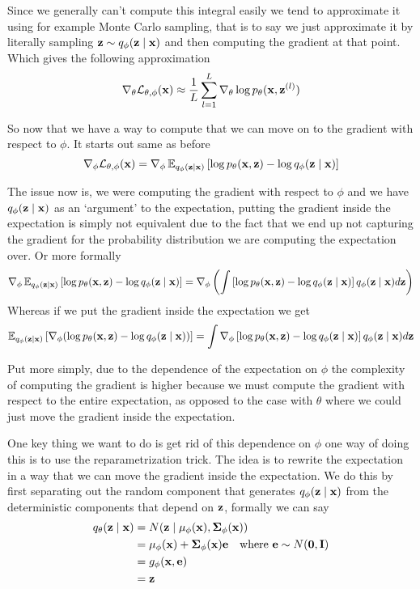\documentclass[12pt]{article}
\begin{document}
Since we generally can't compute this integral easily we tend to approximate it using for example Monte Carlo sampling, that is to say we just approximate it by literally sampling $\mathbf{z} \sim q_\phi(\mathbf{z}\mid \mathbf{x})$ and then computing the gradient at that point. Which gives the following approximation
\[
    \nabla_\theta \mathcal L_{\theta, \phi}(\mathbf{x}) \approx \frac{1}{L}\sum_{l=1}^L \nabla_\theta \log p_\theta(\mathbf{x}, \mathbf{z}^{(l)})    
\]

So now that we have a way to compute that we can move on to the gradient with respect to $\phi$. It starts out same as before 
\[
    \nabla_\phi \mathcal L_{\theta, \phi}(\mathbf{x}) = \nabla_\phi \operatorname{\mathbb{E}}_{q_\phi(\mathbf{z}\mid \mathbf{x})} \left[ \log p_\theta(\mathbf{x}, \mathbf{z}) - \log q_\phi(\mathbf{z} \mid \mathbf{x})\right]    
\]

The issue now is, we were computing the gradient with respect to $\phi$ and we have $q_\phi(\mathbf{z}\mid \mathbf{x})$ as an `argument' to the expectation, putting the gradient inside the expectation is simply not equivalent due to the fact that we end up not capturing the gradient for the probability distribution we are computing the expectation over. Or more formally 
\begin{align*}
    \nabla_\phi \operatorname{\mathbb{E}}_{q_\phi(\mathbf{z}\mid \mathbf{x})} \left[ \log p_\theta(\mathbf{x}, \mathbf{z}) - \log q_\phi(\mathbf{z} \mid \mathbf{x})\right] &= \nabla_\phi \left( \int \left[ \log p_\theta(\mathbf{x}, \mathbf{z}) - \log q_\phi(\mathbf{z} \mid \mathbf{x})\right]q_\phi(\mathbf{z}\mid \mathbf{x}) d\mathbf{z} \right) \\
\end{align*}
Whereas if we put the gradient inside the expectation we get
\[
    \operatorname{\mathbb{E}}_{q_\phi(\mathbf{z}\mid \mathbf{x})} \left[ \nabla_\phi (\log p_\theta(\mathbf{x}, \mathbf{z}) - \log q_\phi(\mathbf{z} \mid \mathbf{x}))\right] = \int \nabla_\phi \left[ \log p_\theta(\mathbf{x}, \mathbf{z}) - \log q_\phi(\mathbf{z} \mid \mathbf{x})\right]q_\phi(\mathbf{z}\mid \mathbf{x}) d\mathbf{z}    
\]

Put more simply, due to the dependence of the expectation on $\phi$ the complexity of computing the gradient is higher because we must compute the gradient with respect to the entire expectation, as opposed to the case with $\theta$ where we could just move the gradient inside the expectation.
\smallskip 

One key thing we want to do is get rid of this dependence on $\phi$ one way of doing this is to use the reparametrization trick. The idea is to rewrite the expectation in a way that we can move the gradient inside the expectation. We do this by first separating out the random component that generates $q_\phi(\mathbf{z}\mid \mathbf{x})$ from the deterministic components that depend on $\mathbf{z}$, formally we can say 
\begin{align*}
    q_\theta(\mathbf{z}\mid \mathbf{x}) &= N(\mathbf{z} \mid \mu_\phi(\mathbf{x}), \mathbf{\Sigma}_\phi(\mathbf{x})) \\
    &= \mu_\phi(\mathbf{x}) + \mathbf{\Sigma}_\phi(\mathbf{x})\mathbf{e} \quad \text{where } \mathbf{e} \sim N(\mathbf{0}, \mathbf{I}) \\ 
    &= g_\phi(\mathbf{x}, \mathbf{e}) \\ 
    &= \mathbf{z}    
\end{align*}
\end{document}
